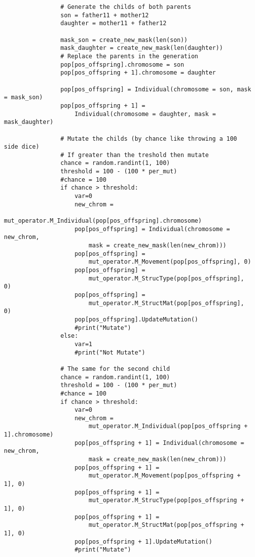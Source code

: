 \begin{verbatim}
                # Generate the childs of both parents
                son = father11 + mother12
                daughter = mother11 + father12
                
                mask_son = create_new_mask(len(son))
                mask_daughter = create_new_mask(len(daughter))
                # Replace the parents in the generation
                pop[pos_offspring].chromosome = son
                pop[pos_offspring + 1].chromosome = daughter
                
                pop[pos_offspring] = Individual(chromosome = son, mask = mask_son)
                pop[pos_offspring + 1] = 
                    Individual(chromosome = daughter, mask = mask_daughter)

                # Mutate the childs (by chance like throwing a 100 side dice)
                # If greater than the treshold then mutate
                chance = random.randint(1, 100)
                threshold = 100 - (100 * per_mut)
                #chance = 100
                if chance > threshold:
                    var=0
                    new_chrom = 
                        mut_operator.M_Individual(pop[pos_offspring].chromosome)
                    pop[pos_offspring] = Individual(chromosome = new_chrom, 
                        mask = create_new_mask(len(new_chrom)))
                    pop[pos_offspring] = 
                        mut_operator.M_Movement(pop[pos_offspring], 0)
                    pop[pos_offspring] = 
                        mut_operator.M_StrucType(pop[pos_offspring], 0)
                    pop[pos_offspring] = 
                        mut_operator.M_StructMat(pop[pos_offspring], 0)
                    pop[pos_offspring].UpdateMutation()
                    #print("Mutate")
                else:
                    var=1
                    #print("Not Mutate")
                
                # The same for the second child
                chance = random.randint(1, 100)
                threshold = 100 - (100 * per_mut)
                #chance = 100
                if chance > threshold:
                    var=0
                    new_chrom = 
                        mut_operator.M_Individual(pop[pos_offspring + 1].chromosome)
                    pop[pos_offspring + 1] = Individual(chromosome = new_chrom, 
                        mask = create_new_mask(len(new_chrom)))
                    pop[pos_offspring + 1] = 
                        mut_operator.M_Movement(pop[pos_offspring + 1], 0)
                    pop[pos_offspring + 1] = 
                        mut_operator.M_StrucType(pop[pos_offspring + 1], 0)
                    pop[pos_offspring + 1] = 
                        mut_operator.M_StructMat(pop[pos_offspring + 1], 0)
                    pop[pos_offspring + 1].UpdateMutation()
                    #print("Mutate")
                

\end{verbatim}
